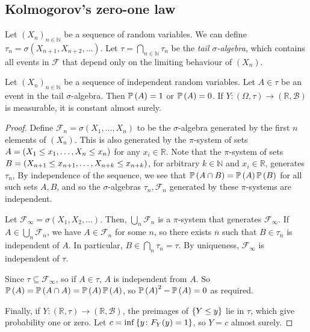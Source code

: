 \subsection{Kolmogorov's zero-one law}
Let \( (X_n)_{n \in \mathbb N} \) be a sequence of random variables.
We can define \( \tau_n = \sigma(X_{n+1}, X_{n+2}, \dots) \).
Let \( \tau = \bigcap_{n \in \mathbb N} \tau_n \) be the \emph{tail \( \sigma \)-algebra}, which contains all events in \( \mathcal F \) that depend only on the limiting behaviour of \( (X_n) \).
\begin{theorem}
	Let \( (X_n)_{n \in \mathbb N} \) be a sequence of independent random variables.
	Let \( A \in \tau \) be an event in the tail \( \sigma \)-algebra.
	Then \( \mathbb{P}\left({A}\right) = 1 \) or \( \mathbb{P}\left({A}\right) = 0 \).
	If \( Y \colon (\Omega,\tau) \to (\mathbb R,\mathcal B) \) is measurable, it is constant almost surely.
\end{theorem}
\begin{proof}
	Define \( \mathcal F_n = \sigma(X_1, \dots, X_n) \) to be the \( \sigma \)-algebra generated by the first \( n \) elements of \( (X_n) \).
	This is also generated by the \( \pi \)-system of sets \( A = \qty(X_1 \leq x_1, \dots, X_n \leq x_n) \) for any \( x_i \in \mathbb R \).
	Note that the \( \pi \)-system of sets \( B = \qty(X_{n+1} \leq x_{n+1}, \dots, X_{n+k} \leq x_{n+k}) \), for arbitrary \( k \in \mathbb N \) and \( x_i \in \mathbb R \), generates \( \tau_n \),
	By independence of the sequence, we see that \( \mathbb{P}\left({A \cap B}\right) = \mathbb{P}\left({A}\right) \mathbb{P}\left({B}\right) \) for all such sets \( A, B \), and so the \( \sigma \)-algebras \( \tau_n, \mathcal F_n \) generated by these \( \pi \)-systems are independent.

	Let \( \mathcal F_\infty = \sigma(X_1, X_2, \dots) \).
	Then, \( \bigcup_n \mathcal F_n \) is a \( \pi \)-system that generates \( \mathcal F_\infty \).
	If \( A \in \bigcup_n \mathcal F_n \), we have \( A \in \mathcal F_n \) for some \( n \), so there exists \( \overline n \) such that \( B \in \tau_{\overline n} \) is independent of \( A \).
	In particular, \( B \in \bigcap_n \tau_n = \tau \).
	By uniqueness, \( \mathcal F_\infty \) is independent of \( \tau \).

	Since \( \tau \subseteq \mathcal F_\infty \), so if \( A \in \tau \), \( A \) is independent from \( A \).
	So \( \mathbb{P}\left({A}\right) = \mathbb{P}\left({A \cap A}\right) = \mathbb{P}\left({A}\right)\mathbb{P}\left({A}\right) \), so \( \mathbb{P}\left({A}\right)^2 - \mathbb{P}\left({A}\right) = 0 \) as required.

	Finally, if \( Y \colon (\mathbb R,\tau) \to (\mathbb R,\mathcal B) \), the preimages of \( \qty{Y \leq y} \) lie in \( \tau \), which give probability one or zero.
	Let \( c = \inf\qty{y \colon F_Y(y) = 1} \), so \( Y = c \) almost surely.
\end{proof}
